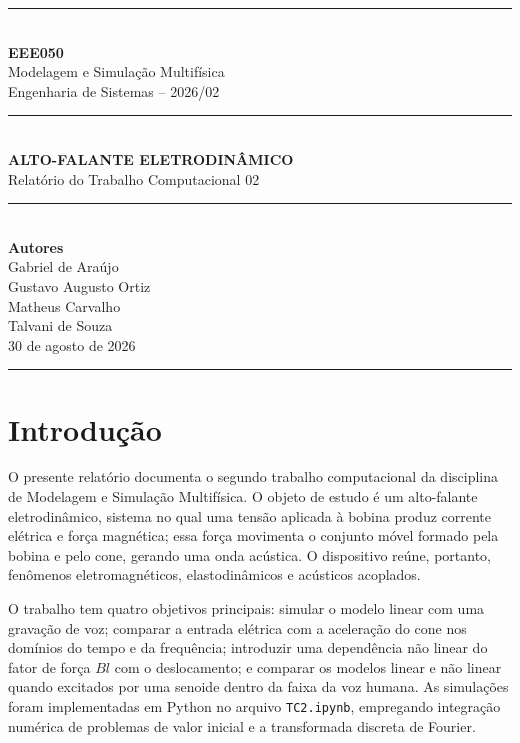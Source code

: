 \documentclass[11pt,letterpaper]{article}
\begin{document}
\hypersetup{pageanchor=false}
\begin{titlepage}
  \thispagestyle{empty}
  \centering
  {\color{reportblue}\rule{0.82\textwidth}{1.2pt}}\\[1.3cm]
  {\large\bfseries EEE050}\\[0.35cm]
  {\large Modelagem e Simulação Multifísica}\\[0.25cm]
  {\normalsize Engenharia de Sistemas -- 2026/02}\\[1.25cm]
  {\color{lightblue}\rule{0.82\textwidth}{5pt}}\\[1.15cm]
  {\color{reportblue}\fontsize{23}{28}\selectfont\bfseries ALTO-FALANTE ELETRODINÂMICO}\\[0.45cm]
  {\large Relatório do Trabalho Computacional 02}\\[1.0cm]
  {\color{lightblue}\rule{0.82\textwidth}{5pt}}\\[1.35cm]
  {\large\bfseries Autores}\\[0.55cm]
  {\large
    Gabriel de Araújo\\
    Gustavo Augusto Ortiz\\
    Matheus Carvalho\\
    Talvani de Souza
  }\\[1.5cm]
  \vfill
  {\large 30 de agosto de 2026}\\[0.75cm]
  {\color{reportblue}\rule{0.82\textwidth}{1.2pt}}
\end{titlepage}

\hypersetup{pageanchor=true}
\setcounter{page}{1}
\tableofcontents
\clearpage

\section{Introdução}

O presente relatório documenta o segundo trabalho computacional da disciplina de Modelagem e
Simulação Multifísica. O objeto de estudo é um alto-falante eletrodinâmico, sistema no qual uma
tensão aplicada à bobina produz corrente elétrica e força magnética; essa força movimenta o conjunto
móvel formado pela bobina e pelo cone, gerando uma onda acústica. O dispositivo reúne, portanto,
fenômenos eletromagnéticos, elastodinâmicos e acústicos acoplados.

O trabalho tem quatro objetivos principais: simular o modelo linear com uma gravação de voz;
comparar a entrada elétrica com a aceleração do cone nos domínios do tempo e da frequência;
introduzir uma dependência não linear do fator de força $Bl$ com o deslocamento; e comparar os
modelos linear e não linear quando excitados por uma senoide dentro da faixa da voz humana. As
simulações foram implementadas em Python no arquivo \texttt{TC2.ipynb}, empregando integração
numérica de problemas de valor inicial e a transformada discreta de Fourier.
\end{document}
